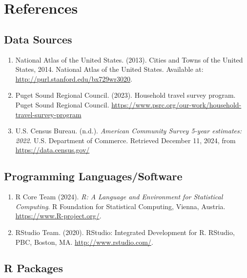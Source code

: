 \documentclass[
]{article}
\providecommand{\tightlist}{%
  \setlength{\itemsep}{0pt}\setlength{\parskip}{0pt}}
\begin{document}
\section{References}\label{references}

\subsection{Data Sources}\label{data-sources-1}

\begin{enumerate}
\def\labelenumi{\arabic{enumi}.}
\tightlist
\item
  National Atlas of the United States. (2013). Cities and Towns of the
  United States, 2014. National Atlas of the United States. Available
  at: \url{http://purl.stanford.edu/bx729wr3020}.
\item
  Puget Sound Regional Council. (2023). Household travel survey program.
  Puget Sound Regional Council.
  \url{https://www.psrc.org/our-work/household-travel-survey-program}
\item
  U.S. Census Bureau. (n.d.). \emph{American Community Survey 5-year
  estimates: 2022}. U.S. Department of Commerce. Retrieved December 11,
  2024, from \url{https://data.census.gov/}
\end{enumerate}

\subsection{Programming
Languages/Software}\label{programming-languagessoftware}

\begin{enumerate}
\def\labelenumi{\arabic{enumi}.}
\tightlist
\item
  R Core Team (2024). \emph{R: A Language and Environment for
  Statistical Computing}. R Foundation for Statistical Computing,
  Vienna, Austria. \url{https://www.R-project.org/}.
\item
  RStudio Team. (2020). RStudio: Integrated Development for R. RStudio,
  PBC, Boston, MA. \url{http://www.rstudio.com/}.
\end{enumerate}

\subsection{R Packages}\label{r-packages}
\end{document}

